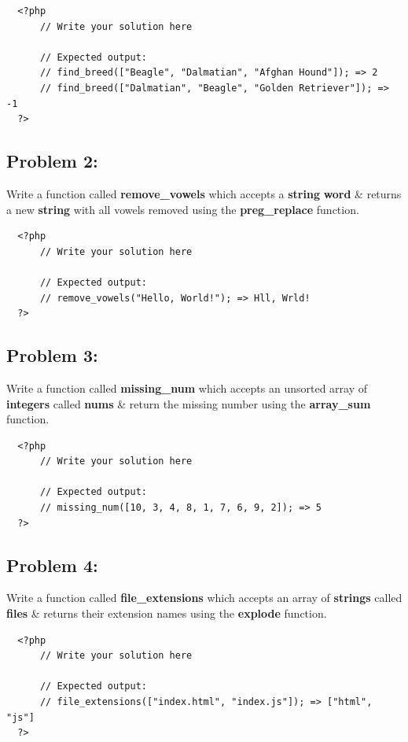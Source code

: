 \documentclass{article}
\begin{document}
\begin{verbatim}
  <?php
      // Write your solution here

      // Expected output:
      // find_breed(["Beagle", "Dalmatian", "Afghan Hound"]); => 2
      // find_breed(["Dalmatian", "Beagle", "Golden Retriever"]); => -1
  ?>
\end{verbatim}

\subsection*{Problem 2:} 
Write a function called \textbf{remove\_vowels} which accepts a \textbf{string} \textbf{word} \& returns a new \textbf{string} with all vowels removed using the \textbf{preg\_replace} function.

\begin{verbatim}
  <?php
      // Write your solution here

      // Expected output:
      // remove_vowels("Hello, World!"); => Hll, Wrld!
  ?>
\end{verbatim}

\subsection*{Problem 3:} 
Write a function called \textbf{missing\_num} which accepts an unsorted array of \textbf{integers} called \textbf{nums} \& return the missing number using the \textbf{array\_sum} function.

\begin{verbatim}
  <?php
      // Write your solution here

      // Expected output:
      // missing_num([10, 3, 4, 8, 1, 7, 6, 9, 2]); => 5
  ?>
\end{verbatim}

\subsection*{Problem 4:}
Write a function called \textbf{file\_extensions} which accepts an array of \textbf{strings} called \textbf{files} \& returns their extension names using the \textbf{explode} function.

\begin{verbatim}
  <?php
      // Write your solution here

      // Expected output:
      // file_extensions(["index.html", "index.js"]); => ["html", "js"]
  ?>
\end{verbatim}
\end{document}
